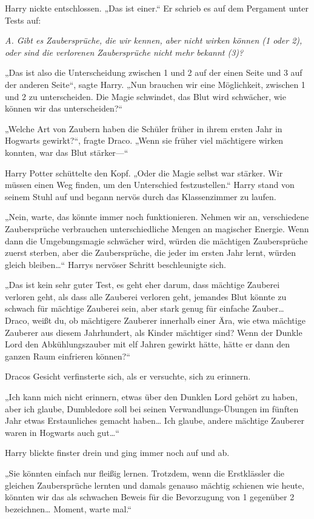 {Harry nickte entschlossen. „Das ist einer.“ Er schrieb es auf dem Pergament unter Tests auf:

\emph{A. Gibt es Zaubersprüche, die wir kennen, aber nicht wirken können (1 oder 2), oder sind die verlorenen Zaubersprüche nicht mehr bekannt (3)?}

„Das ist also die Unterscheidung zwischen 1 und 2 auf der einen Seite und 3 auf der anderen Seite“, sagte Harry. „Nun brauchen wir eine Möglichkeit, zwischen 1 und 2 zu unterscheiden. Die Magie schwindet, das Blut wird schwächer, wie können wir das unterscheiden?“

„Welche Art von Zaubern haben die Schüler früher in ihrem ersten Jahr in Hogwarts gewirkt?“, fragte Draco. „Wenn sie früher viel mächtigere wirken konnten, war das Blut stärker—“

Harry Potter schüttelte den Kopf. „Oder die Magie selbst war stärker. Wir müssen einen Weg finden, um den Unterschied festzustellen.“ Harry stand von seinem Stuhl auf und begann nervös durch das Klassenzimmer zu laufen.

„Nein, warte, das könnte immer noch funktionieren. Nehmen wir an, verschiedene Zaubersprüche verbrauchen unterschiedliche Mengen an magischer Energie. Wenn dann die Umgebungsmagie schwächer wird, würden die mächtigen Zaubersprüche zuerst sterben, aber die Zaubersprüche, die jeder im ersten Jahr lernt, würden gleich bleiben…“ Harrys nervöser Schritt beschleunigte sich.

„Das ist kein sehr guter Test, es geht eher darum, dass mächtige Zauberei verloren geht, als dass alle Zauberei verloren geht, jemandes Blut könnte zu schwach für mächtige Zauberei sein, aber stark genug für einfache Zauber… Draco, weißt du, ob mächtigere Zauberer innerhalb einer Ära, wie etwa mächtige Zauberer aus diesem Jahrhundert, als Kinder mächtiger sind? Wenn der Dunkle Lord den Abkühlungszauber mit elf Jahren gewirkt hätte, hätte er dann den ganzen Raum einfrieren können?“

Dracos Gesicht verfinsterte sich, als er versuchte, sich zu erinnern.

„Ich kann mich nicht erinnern, etwas über den Dunklen Lord gehört zu haben, aber ich glaube, Dumbledore soll bei seinen Verwandlungs-Übungen im fünften Jahr etwas Erstaunliches gemacht haben… Ich glaube, andere mächtige Zauberer waren in Hogwarts auch gut…“

Harry blickte finster drein und ging immer noch auf und ab.

„Sie könnten einfach nur fleißig lernen. Trotzdem, wenn die Erstklässler die gleichen Zaubersprüche lernten und damals genauso mächtig schienen wie heute, könnten wir das als schwachen Beweis für die Bevorzugung von 1 gegenüber 2 bezeichnen… Moment, warte mal.“

}
